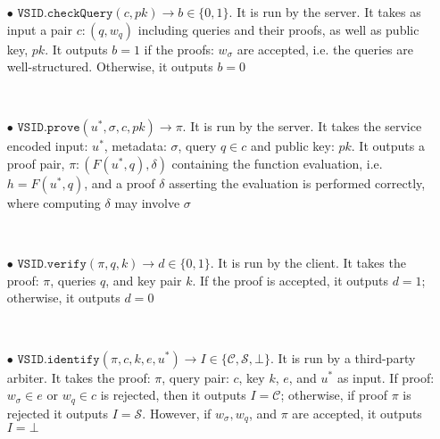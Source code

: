 \begin{definition}
\begin{itemize}

\

\item[$\bullet$] $\mathtt{VSID.checkQuery}(c, pk)\rightarrow b\in\{0,1\}$. It is run by the server. It takes as input a pair $c:(q,w_{\scriptscriptstyle q})$ including queries and their proofs, as well as public key, $pk$. It outputs $b = 1$ if the proofs: $w_{\scriptscriptstyle\sigma}$ are accepted, i.e. the queries are well-structured. Otherwise, it outputs $b = 0$

\

\item[$\bullet$] $\mathtt{VSID.prove}(u^{\scriptscriptstyle *},\sigma,c,pk)\rightarrow \pi$. It is run by the server. It  takes the  service encoded input: $u^{\scriptscriptstyle *}$, metadata: $\sigma$,  query $q\in c$ and public key: $pk$. It outputs a proof pair, $\pi:(F(u^{\scriptscriptstyle *},q),\delta)$ containing the function evaluation, i.e. $h=F(u^{\scriptscriptstyle *},q)$, and a proof $\delta$ asserting the evaluation is performed correctly, where computing $\delta$ may involve $\sigma$




\

\item[$\bullet$] $\mathtt{VSID.verify}(\pi,q,k)\rightarrow d\in\{0,1\}$. It is run by the client. It takes the proof: $\pi$,   queries $q$, and key pair $k$. If the proof is accepted, it outputs $d=1$; otherwise, it outputs $d=0$ 

\

\item[$\bullet$]  $\mathtt{VSID.identify}(\pi,c,k,e,u^{\scriptscriptstyle *})\rightarrow I\in \{ \mathcal{C},\mathcal{S},\bot\}$. It is run by a third-party arbiter. It takes the proof: $\pi$,  query pair: $c$,  key $k$,    $e$, and $u^{\scriptscriptstyle *}$  as input. If   proof: $w_{\scriptscriptstyle\sigma}\in e$ or $w_{\scriptscriptstyle q}\in c$  is rejected, then it outputs $I=\mathcal C$; otherwise, if proof $\pi$ is rejected it outputs $I=\mathcal S$.  However, if  $w_{\scriptscriptstyle\sigma},w_{\scriptscriptstyle q}$, and $\pi$ are accepted, it outputs   $I=\bot$ 



\end{itemize}
\end{definition}


